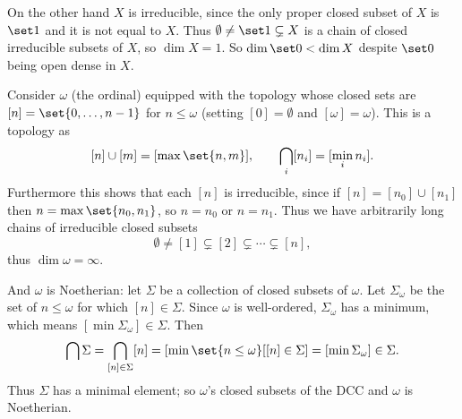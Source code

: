     On the other hand $X$ is irreducible, since the only proper closed subset of $X$ is $\set1$ and it is not equal to $X$.
    Thus $\emptyset\neq\set1\subsetneq X$ is a chain of closed irreducible subsets of $X$, so $\dim X=1$.
    So $\dim\set0<\dim X$ despite $\set0$ being open dense in $X$.

    \item Consider $\omega$ (the ordinal) equipped with the topology whose closed sets are $[n]=\set{0,\dots,n-1}$ for $n\leq\omega$ (setting $[0]=\emptyset$ and $[\omega]=\omega$).
    This is a topology as
    $$ [n] \cup [m] = [\max\set{n,m}],\qquad \bigcap_i[n_i] = [\min_in_i] . $$
    Furthermore this shows that each $[n]$ is irreducible, since if $[n]=[n_0]\cup[n_1]$ then $n=\max\set{n_0,n_1}$, so $n=n_0$ or $n=n_1$.
    Thus we have arbitrarily long chains of irreducible closed subsets
    $$ \emptyset \neq [1] \subsetneq [2] \subsetneq \cdots \subsetneq [n] , $$
    thus $\dim\omega=\infty$.

    And $\omega$ is Noetherian: let $\Sigma$ be a collection of closed subsets of $\omega$.
    Let $\Sigma_\omega$ be the set of $n\leq\omega$ for which $[n]\in\Sigma$.
    Since $\omega$ is well-ordered, $\Sigma_\omega$ has a minimum, which means $[\min\Sigma_\omega]\in\Sigma$.
    Then
    $$ \bigcap\Sigma = \bigcap_{[n]\in\Sigma}[n] = [\min\set{n\leq\omega}[{[n]\in\Sigma}] = [\min\Sigma_\omega] \in \Sigma . $$
    Thus $\Sigma$ has a minimal element; so $\omega$'s closed subsets of the DCC and $\omega$ is Noetherian.
\eenum

\bye

